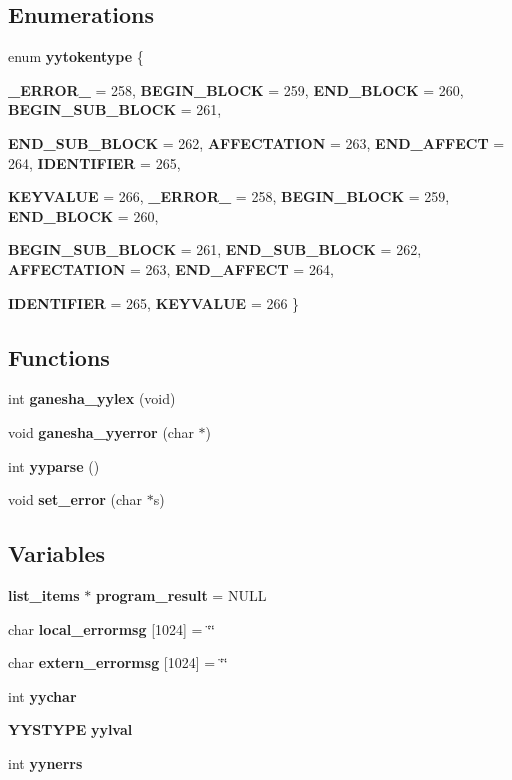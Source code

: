 \subsection*{Enumerations}
\begin{CompactItemize}
\item 
enum {\bf yytokentype} \{ \par
{\bf \_\-ERROR\_\-} =  258, 
{\bf BEGIN\_\-BLOCK} =  259, 
{\bf END\_\-BLOCK} =  260, 
{\bf BEGIN\_\-SUB\_\-BLOCK} =  261, 
\par
{\bf END\_\-SUB\_\-BLOCK} =  262, 
{\bf AFFECTATION} =  263, 
{\bf END\_\-AFFECT} =  264, 
{\bf IDENTIFIER} =  265, 
\par
{\bf KEYVALUE} =  266, 
{\bf \_\-ERROR\_\-} =  258, 
{\bf BEGIN\_\-BLOCK} =  259, 
{\bf END\_\-BLOCK} =  260, 
\par
{\bf BEGIN\_\-SUB\_\-BLOCK} =  261, 
{\bf END\_\-SUB\_\-BLOCK} =  262, 
{\bf AFFECTATION} =  263, 
{\bf END\_\-AFFECT} =  264, 
\par
{\bf IDENTIFIER} =  265, 
{\bf KEYVALUE} =  266
 \}
\end{CompactItemize}
\subsection*{Functions}
\begin{CompactItemize}
\item 
int {\bf ganesha\_\-yylex} (void)
\item 
void {\bf ganesha\_\-yyerror} (char $\ast$)
\item 
int {\bf yyparse} ()
\item 
void {\bf set\_\-error} (char $\ast$s)
\end{CompactItemize}
\subsection*{Variables}
\begin{CompactItemize}
\item 
{\bf list\_\-items} $\ast$ {\bf program\_\-result} = NULL
\item 
char {\bf local\_\-errormsg} [1024] = \char`\"{}\char`\"{}
\item 
char {\bf extern\_\-errormsg} [1024] = \char`\"{}\char`\"{}
\item 
int {\bf yychar}
\item 
{\bf YYSTYPE} {\bf yylval}
\item 
int {\bf yynerrs}
\end{CompactItemize}


